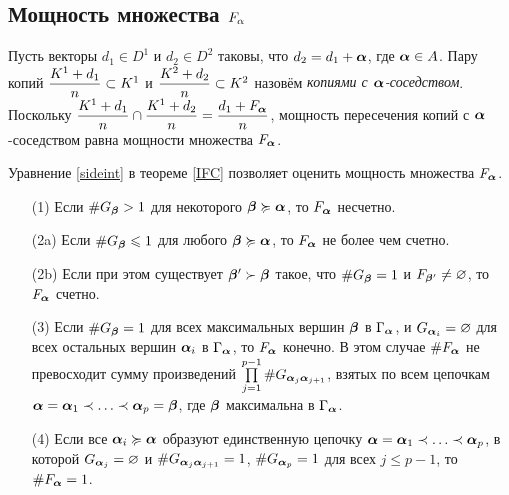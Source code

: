 \subsection{Мощность множества $F_\alpha$}

Пусть  векторы $d_1\in D^1$ и $d_2\in D^2$ таковы, что $d_2=d_1+{\bm{\alpha}}$, где  ${\bm{\alpha}}\in A$.
Пару копий $\dfrac{K^1+d_1}{n}\subset K^1$ и $\dfrac{K^2+d_2}{n}\subset K^2$ назовём {\em копиями с ${\bm{\alpha}}$-соседством}.
Поскольку $\dfrac{K^1+d_1}{n}\cap\dfrac{K^1+d_2}{n}=\dfrac{d_1+F_{\bm{\alpha}}}{n}$, мощность пересечения копий с ${\bm{\alpha}}$-соседством равна   мощности множества $F_{\bm{\alpha}}$.

Уравнение \eqref{sideint} в теореме \ref{IFC} позволяет оценить мощность множества $F_{\bm{\alpha}}$.

\begin{theorem}\label{fin_int}
\qquad
\begin{enumerate}[nolistsep]
\item[(1)] Если $\#G_{\bm{\beta}}>1$ для некоторого ${\bm{\beta}}\succcurlyeq{\bm{\alpha}}$, то  $F_{\bm{\alpha}}$ несчетно.

\item[(2a)] Если  $\#G_{\bm{\beta}}\leqslant1$ для любого ${\bm{\beta}}\succcurlyeq{\bm{\alpha}}$, то  $F_{\bm{\alpha}}$ не более чем счетно.


\item[(2b)] Если при этом существует ${\bm{\beta}}'\succ{\bm{\beta}}$ такое, что $\#G_{\bm{\beta}}=1$ и $F_{{\bm{\beta}}'}\neq\varnothing$, то $F_{\bm{\alpha}}$ счетно.

\item[(3)] Если  $\#G_{\bm{\beta}}=1$ для всех максимальных вершин ${\bm{\beta}}$ в $\Gamma_{\bm{\alpha}}$, и $G_{{\bm{\alpha}}_i}=\varnothing$ для всех остальных вершин ${\bm{\alpha}}_i$ в $\Gamma_{\bm{\alpha}}$, то $F_{\bm{\alpha}}$ конечно.
В этом случае $\#F_{\bm{\alpha}}$ не превосходит сумму произведений $\prod \limits_{j=1}^{p-1}\# G_{{\bm{\alpha}}_j{\bm{\alpha}}_{j+1}}$, взятых по всем цепочкам ${\bm{\alpha}}={\bm{\alpha}}_1\prec\ldots\prec{\bm{\alpha}}_p={\bm{\beta}}$, где ${\bm{\beta}}$  максимальна в $\Gamma_{\bm{\alpha}}$.

\item[(4)] Если все ${\bm{\alpha}}_i\succcurlyeq{\bm{\alpha}}$ образуют единственную цепочку ${\bm{\alpha}}={\bm{\alpha}}_1\prec\ldots\prec{\bm{\alpha}}_p$, в которой $G_{{\bm{\alpha}}_j}=\varnothing$ и $\# G_{{\bm{\alpha}}_j{\bm{\alpha}}_{j+1}}=1$, $\#G_{{\bm{\alpha}}_p}=1$ для всех $j\le p-1$, то $\#F_{\bm{\alpha}}=1$.
\end{enumerate}
\end{theorem}


